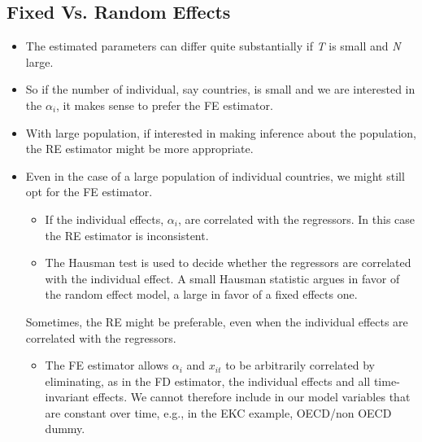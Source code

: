 \documentclass[landscape,letterpaper,9pt]{article}
\begin{document}
\subsection{Fixed Vs. Random Effects}
\begin{itemize}
    \item The estimated parameters can differ quite substantially if \emph{T} is small and \emph{N} large.
    \item So if the number of individual, say countries, is small and we are interested in the \(\alpha_i\),
    it makes sense to prefer the FE estimator.
    \item With large population, if interested in making inference about the population, the RE estimator might
    be more appropriate.
    \item Even in the case of a large population of individual countries, we might still opt for the FE estimator.
    \begin{itemize}
        \item If the individual effects, \(\alpha_i\), are correlated with the regressors. In this case
        the RE estimator is inconsistent.
        \item  The Hausman test is used to decide whether the regressors are correlated with the
    individual effect.
    A small Hausman statistic argues in favor of the random effect model, a large in favor of a fixed effects one.
   \end{itemize}
   Sometimes, the RE might be preferable, even when the individual effects are correlated with
   the regressors.
    \begin{itemize}
    \item The FE estimator allows \(\alpha_i\) and \(x_{it}\) to be arbitrarily correlated by
        eliminating, as in the FD estimator, the individual effects and all time-invariant effects.
        We cannot therefore include in our model variables that are constant over time, e.g., in the EKC example,
        OECD/non OECD dummy.
    \end{itemize}
\end{itemize}



\end{document}
